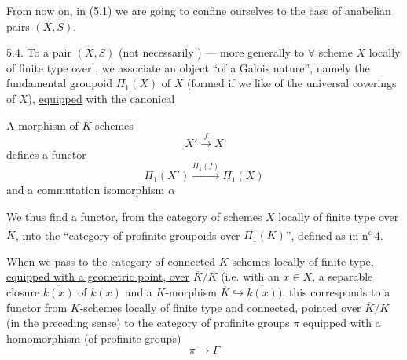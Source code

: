 
From now on, in (5.1) we are going to confine ourselves to the case of
anabelian pairs $(X,S)$.


5.4. To a pair $(X,S)$ (not necessarily ) --- more generally to
$\forall$ scheme $X$ locally of finite type over , we associate an
object ``of a Galois nature'', namely the fundamental groupoid
 $\Pi_1(X)$ of $X$ (formed if we like of the universal
coverings of $X$), \uline{equipped} with the canonical 

A morphism of $K$-schemes
\[
X' \xrightarrow{f} X
\]
defines a functor
\[
\Pi_1(X') \xrightarrow{\Pi_1(f)} \Pi_1(X)
\]
and a commutation isomorphism $\alpha$




We thus find a functor, from the category of schemes
$X$ locally of finite type over $K$, into the ``category of profinite groupoids over
$\Pi_1(K)$'', defined as in n\textsuperscript{o}\,4.

When we pass to the category of connected $K$-schemes locally of finite type,
 \uline{equipped with a geometric point,
over} $\overline K/K$ (i.e. with an $x\in X$,
 a separable closure $\overline{k(x)}$ of $k(x)$ and a
$K$-morphism $\overline K\hookrightarrow\overline{k(x)}$), this corresponds
to a functor from $K$-schemes locally of finite type and connected, pointed over
$\overline K/K$ (in the preceding sense) to the category of
 profinite groups  $\pi$
equipped with a homomorphism (of profinite groups)
\[
\pi\longrightarrow\Gamma
\]


